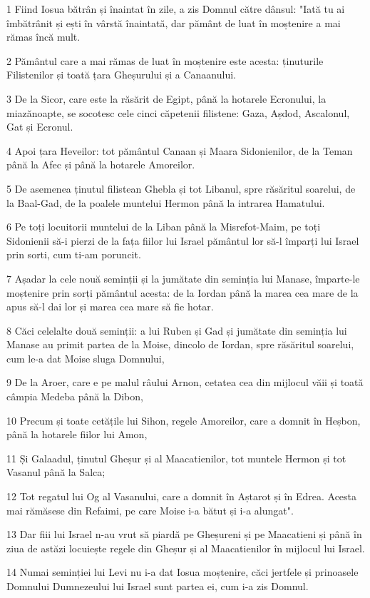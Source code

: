 \par 1 Fiind Iosua bătrân și înaintat în zile, a zis Domnul către dânsul: "Iată tu ai îmbătrânit și ești în vârstă înaintată, dar pământ de luat în moștenire a mai rămas încă mult.
\par 2 Pământul care a mai rămas de luat în moștenire este acesta: ținuturile Filistenilor și toată țara Gheșurului și a Canaanului.
\par 3 De la Sicor, care este la răsărit de Egipt, până la hotarele Ecronului, la miazănoapte, se socotesc cele cinci căpetenii filistene: Gaza, Așdod, Ascalonul, Gat și Ecronul.
\par 4 Apoi țara Heveilor: tot pământul Canaan și Maara Sidonienilor, de la Teman până la Afec și până la hotarele Amoreilor.
\par 5 De asemenea ținutul filistean Ghebla și tot Libanul, spre răsăritul soarelui, de la Baal-Gad, de la poalele muntelui Hermon până la intrarea Hamatului.
\par 6 Pe toți locuitorii muntelui de la Liban până la Misrefot-Maim, pe toți Sidonienii să-i pierzi de la fața fiilor lui Israel pământul lor să-l împarți lui Israel prin sorti, cum ti-am poruncit.
\par 7 Așadar la cele nouă seminții și la jumătate din seminția lui Manase, împarte-le moștenire prin sorți pământul acesta: de la Iordan până la marea cea mare de la apus să-l dai lor și marea cea mare să fie hotar.
\par 8 Căci celelalte două seminții: a lui Ruben și Gad și jumătate din seminția lui Manase au primit partea de la Moise, dincolo de Iordan, spre răsăritul soarelui, cum le-a dat Moise sluga Domnului,
\par 9 De la Aroer, care e pe malul râului Arnon, cetatea cea din mijlocul văii și toată câmpia Medeba până la Dibon,
\par 10 Precum și toate cetățile lui Sihon, regele Amoreilor, care a domnit în Heșbon, până la hotarele fiilor lui Amon,
\par 11 Și Galaadul, ținutul Gheșur și al Maacatienilor, tot muntele Hermon și tot Vasanul până la Salca;
\par 12 Tot regatul lui Og al Vasanului, care a domnit în Aștarot și în Edrea. Acesta mai rămăsese din Refaimi, pe care Moise i-a bătut și i-a alungat".
\par 13 Dar fiii lui Israel n-au vrut să piardă pe Gheșureni și pe Maacatieni și până în ziua de astăzi locuiește regele din Gheșur și al Maacatienilor în mijlocul lui Israel.
\par 14 Numai seminției lui Levi nu i-a dat Iosua moștenire, căci jertfele și prinoasele Domnului Dumnezeului lui Israel sunt partea ei, cum i-a zis Domnul.

